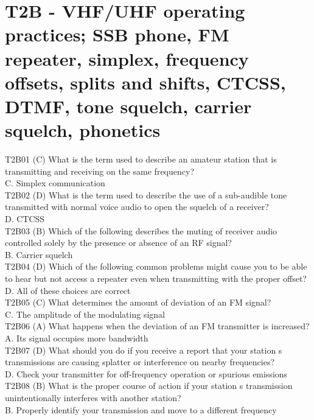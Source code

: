 \documentclass[12pt,letterpaper]{report}
\begin{document}
\section{T2B - VHF/UHF operating practices; SSB phone, FM repeater, simplex, frequency offsets, splits and shifts, CTCSS, DTMF, tone squelch, carrier squelch, phonetics}

T2B01 (C) What is the term used to describe an amateur station that is transmitting and receiving on the same frequency?\\
C. Simplex communication\\

T2B02 (D) What is the term used to describe the use of a sub-audible tone transmitted with normal voice audio to open the squelch of a receiver?\\
D. CTCSS\\

T2B03 (B) Which of the following describes the muting of receiver audio controlled solely by the presence or absence of an RF signal?\\
B. Carrier squelch\\

T2B04 (D) Which of the following common problems might cause you to be able to hear but not access a repeater even when transmitting with the proper offset?\\
D. All of these choices are correct\\

T2B05 (C) What determines the amount of deviation of an FM signal?\\
C. The amplitude of the modulating signal\\

T2B06 (A) What happens when the deviation of an FM transmitter is increased?\\
A. Its signal occupies more bandwidth\\

T2B07 (D) What should you do if you receive a report that your station s transmissions are causing splatter or interference on nearby frequencies?\\
D. Check your transmitter for off-frequency operation or spurious emissions\\

T2B08 (B) What is the proper course of action if your station s transmission unintentionally interferes with another station?\\
B. Properly identify your transmission and move to a different frequency\\
\end{document}
